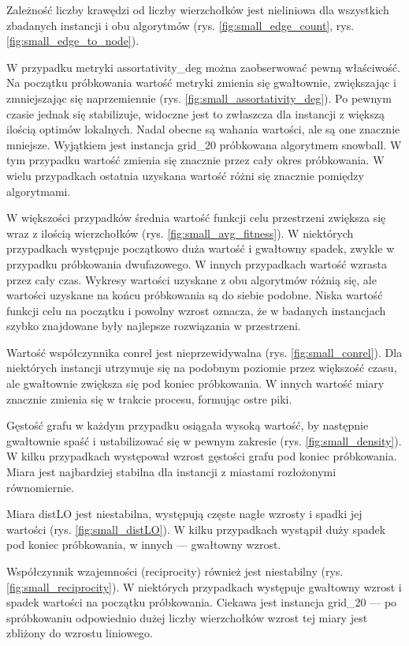 Zależność liczby krawędzi od liczby wierzchołków jest nieliniowa dla wszystkich zbadanych instancji i obu algorytmów (rys. \ref{fig:small_edge_count}, rys. \ref{fig:small_edge_to_node}).

W przypadku metryki assortativity\_deg można zaobserwować pewną właściwość.
Na początku próbkowania wartość metryki zmienia się gwałtownie, zwiększając i zmniejszając się naprzemiennie (rys. \ref{fig:small_assortativity_deg}).
Po pewnym czasie jednak się stabilizuje, widoczne jest to zwłaszcza dla instancji z większą ilością optimów lokalnych.
Nadal obecne są wahania wartości, ale są one znacznie mniejsze.
Wyjątkiem jest instancja grid\_20 próbkowana algorytmem snowball.
W tym przypadku wartość zmienia się znacznie przez cały okres próbkowania.
W wielu przypadkach ostatnia uzyskana wartość różni się znacznie pomiędzy algorytmami.

W większości przypadków średnia wartość funkcji celu przestrzeni zwiększa się wraz z ilością wierzchołków (rys. \ref{fig:small_avg_fitness}).
W niektórych przypadkach występuje początkowo duża wartość i gwałtowny spadek, zwykle w przypadku próbkowania dwufazowego.
W innych przypadkach wartość wzrasta przez cały czas.
Wykresy wartości uzyskane z obu algorytmów różnią się, ale wartości uzyskane na końcu próbkowania są do siebie podobne.
Niska wartość funkcji celu na początku i powolny wzrost oznacza, że w badanych instancjach szybko znajdowane były
najlepsze rozwiązania w przestrzeni.

Wartość współczynnika conrel jest nieprzewidywalna (rys. \ref{fig:small_conrel}).
Dla niektórych instancji utrzymuje się na podobnym poziomie przez większość czasu,
ale gwałtownie zwiększa się pod koniec próbkowania.
W innych wartość miary znacznie zmienia się w trakcie procesu, formując ostre piki.

Gęstość grafu w każdym przypadku osiągała wysoką wartość, by następnie gwałtownie spaść i ustabilizować się w pewnym zakresie (rys. \ref{fig:small_density}).
W kilku przypadkach występował wzrost gęstości grafu pod koniec próbkowania.
Miara jest najbardziej stabilna dla instancji z miastami rozłożonymi równomiernie.

Miara distLO jest niestabilna, występują częste nagłe wzrosty i spadki jej wartości (rys. \ref{fig:small_distLO}).
W kilku przypadkach wystąpił duży spadek pod koniec próbkowania, w innych --- gwałtowny wzrost.

Współczynnik wzajemności (reciprocity) również jest niestabilny (rys. \ref{fig:small_reciprocity}).
W niektórych przypadkach występuje gwałtowny wzrost i spadek wartości na początku próbkowania.
Ciekawa jest instancja grid\_20 --- po spróbkowaniu odpowiednio dużej liczby wierzchołków
wzrost tej miary jest zbliżony do wzrostu liniowego.

